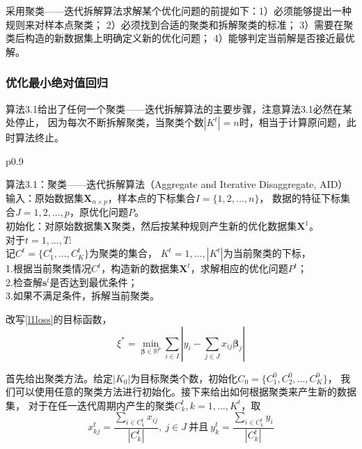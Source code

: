 采用聚类——迭代拆解算法求解某个优化问题的前提如下：1）必须能够提出一种规则来对样本点聚类；
2）必须找到合适的聚类和拆解聚类的标准；
3）需要在聚类后构造的新数据集上明确定义新的优化问题；
4）能够判定当前解是否接近最优解。

\subsubsection{优化最小绝对值回归}
算法3.1给出了任何一个聚类——迭代拆解算法的主要步骤，注意算法3.1必然在某处停止，
因为每次不断拆解聚类，当聚类个数$|K^{t}|= n$时，相当于计算原问题，此时算法终止。
\begin{table}[H]%
    \centering%
    \begin{tabular}{{p{0.9\columnwidth}}}%
    
    \toprule%
    算法3.1：聚类——迭代拆解算法（Aggregate and Iterative Disaggregate, AID） \\
    \midrule%
    输入：原始数据集$\bm{X}_{n\times p}$，样本点的下标集合${I} = \{1, 2, ..., n\}$，
    数据的特征下标集合${J} = {1, 2, ..., p}$，原优化问题$P$。\\
    初始化：对原始数据集$\bm{X}$聚类，然后按某种规则产生新的优化数据集$\bm{X}^{1}$。 \\
    对于$t = 1, ..., T$:\\
        记${C}^{t} = \{{C}_1^{t}, ..., C_K^{t}\}$为聚类的集合， $K^t = {1, ..., |K^t|}$为当前聚类的下标，
        \\
        1.根据当前聚类情况${C}^{t}$，构造新的数据集$\bm{X}^{t}$，求解相应的优化问题${P}^{t}$； \\
        2.检查解$\bm{s}^{t}$是否达到最优条件；\\
        3.如果不满足条件，拆解当前聚类。
        \\
    \bottomrule%
    \end{tabular}
\end{table}%

改写\eqref{l1loss}的目标函数，
\begin{equation}\label{l1loss2}
\xi^* = \underset{\bm{\beta} \in \mathbb{R}^{p}}{\operatorname{min}} 
\sum_{i \in I}|y_i - \sum_{j \in J}x_{ij}\bm{\beta}_j|
\end{equation}

首先给出聚类方法。给定$|K_0|$为目标聚类个数，初始化$C_0 = \{C_1^0, C_2^0, ..., C_K^0\}$，
我们可以使用任意的聚类方法进行初始化。接下来给出如何根据聚类来产生新的数据集，
对于在任一迭代周期内产生的聚类$C^t_k, k = 1, ..., K^t$，取
\begin{equation*}
    x_{kj}^t = \frac{\sum_{i \in C_k^t}x_{ij}}{|C_k^t|},\ j \in J \  
    \text{并且} \
    y_{k}^t = \frac{\sum_{i \in C_k^t}y_i}{|C_k^t|}
\end{equation*}

